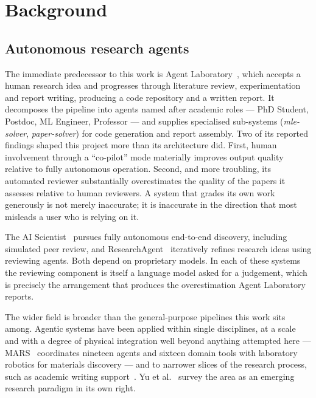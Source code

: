 \section{Background}
\label{sec:background}

\subsection{Autonomous research agents}

The immediate predecessor to this work is Agent Laboratory~\cite{schmidgall2025agentlab},
which accepts a human research idea and progresses through literature review, experimentation
and report writing, producing a code repository and a written report. It decomposes the
pipeline into agents named after academic roles --- PhD Student, Postdoc, ML Engineer,
Professor --- and supplies specialised sub-systems (\emph{mle-solver}, \emph{paper-solver})
for code generation and report assembly. Two of its reported findings shaped this project more
than its architecture did. First, human involvement through a ``co-pilot'' mode materially
improves output quality relative to fully autonomous operation. Second, and more troubling,
its automated reviewer substantially overestimates the quality of the papers it assesses
relative to human reviewers. A system that grades its own work generously is not merely
inaccurate; it is inaccurate in the direction that most misleads a user who is relying on it.

The AI Scientist~\cite{lu2024aiscientist} pursues fully autonomous end-to-end discovery,
including simulated peer review, and ResearchAgent~\cite{baek2024researchagent} iteratively
refines research ideas using reviewing agents. Both depend on proprietary models. In each of
these systems the reviewing component is itself a language model asked for a judgement, which
is precisely the arrangement that produces the overestimation Agent Laboratory reports.

The wider field is broader than the general-purpose pipelines this work sits among. Agentic
systems have been applied within single disciplines, at a scale and with a degree of physical
integration well beyond anything attempted here --- MARS~\cite{shi2026mars} coordinates
nineteen agents and sixteen domain tools with laboratory robotics for materials discovery ---
and to narrower slices of the research process, such as academic writing
support~\cite{jain2026researchhelper}. Yu et al.~\cite{yu2024ai4r} survey the area as an
emerging research paradigm in its own right.

